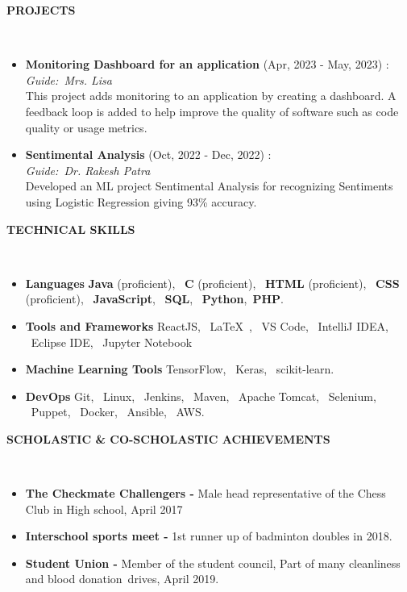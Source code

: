 \documentclass[a4paper,10pt]{article}
\newcommand{\lsep}{-0.5cm}
\newcommand{\resheading}[1]{{\small \colorbox{mygrey}{\begin{minipage}{0.975\textwidth}{\textbf{#1 \vphantom{p\^{E}}}}\end{minipage}}}}
\begin{document}
\resheading{\textbf{PROJECTS} }\\[\lsep]
\begin{itemize}
\setlength\itemsep{0.5em}
\item \textbf{Monitoring Dashboard for an application} (Apr, 2023 - May, 2023) : \\
\textit{Guide:\ Mrs. Lisa}\\
This project adds monitoring to an application by creating a dashboard. A feedback loop is added to help improve the quality of software such as code quality or usage metrics.

\item \textbf{Sentimental Analysis} (Oct, 2022 - Dec, 2022) : \\
\textit{Guide:\ Dr. Rakesh Patra}\\
Developed an ML project Sentimental Analysis for recognizing
Sentiments using Logistic Regression giving 93\% accuracy.
\end{itemize}

\resheading{\textbf{TECHNICAL SKILLS} }\\[\lsep]
\begin{itemize}
\setlength\itemsep{0em}
\item \noindent \textbf{Languages} \textbf{Java} (proficient), \ \textbf{C} (proficient), \ \textbf{HTML} (proficient), \ \textbf{CSS} (proficient), \ \textbf{JavaScript}, \ \textbf{SQL}, \ \textbf{Python},\ \textbf{PHP}.
 \item \noindent\textbf{Tools and Frameworks} ReactJS, \  \LaTeX\ , \ VS Code, \ IntelliJ IDEA, \ Eclipse IDE, \ Jupyter Notebook
\item \noindent \textbf{Machine Learning Tools} TensorFlow, \ Keras, \ scikit-learn.
\item \noindent \textbf{DevOps} Git, \ Linux, \ Jenkins, \ Maven, \ Apache Tomcat, \ Selenium, \ Puppet, \ Docker, \ Ansible, \ AWS.
\end{itemize}

\resheading{\textbf{SCHOLASTIC \& CO-SCHOLASTIC ACHIEVEMENTS} }\\[\lsep]
\begin{itemize}
\setlength\itemsep{0em}
\item \noindent \textbf{The Checkmate Challengers - }Male head representative of the Chess Club in High school, April 2017
\item \noindent\textbf{Interschool sports meet - }1st runner up of badminton doubles in 2018.
\item \noindent\textbf{Student Union - }Member of the student council, Part of many cleanliness and blood donation drives, April 2019.

\end{itemize}
\end{document}
